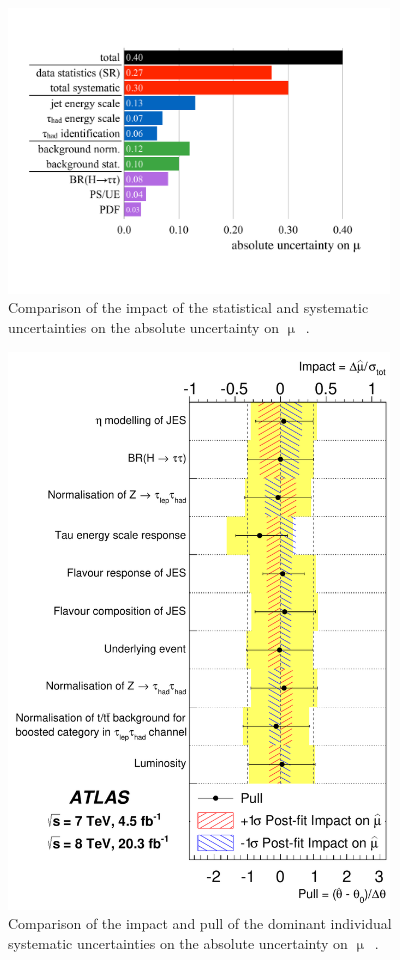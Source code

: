 \begin{figure}[tp]
  \centering
  \includegraphics[width=0.90\textwidth]{figures/HIGG-2013-32/uncertainties}
  \caption{Comparison of the impact of the statistical and systematic uncertainties on the absolute uncertainty on $\upmu$~\cite{HIGG-2013-32}.}
  \label{fig:results-uncertainties-1}
\end{figure}

\begin{figure}[tp]
  \centering
  \includegraphics[width=0.90\textwidth]{figures/HIGG-2013-32/fig_07}
  \caption{Comparison of the impact and pull of the dominant individual systematic uncertainties on the absolute uncertainty on $\upmu$~\cite{HIGG-2013-32}.}
  \label{fig:results-uncertainties-2}
\end{figure}

